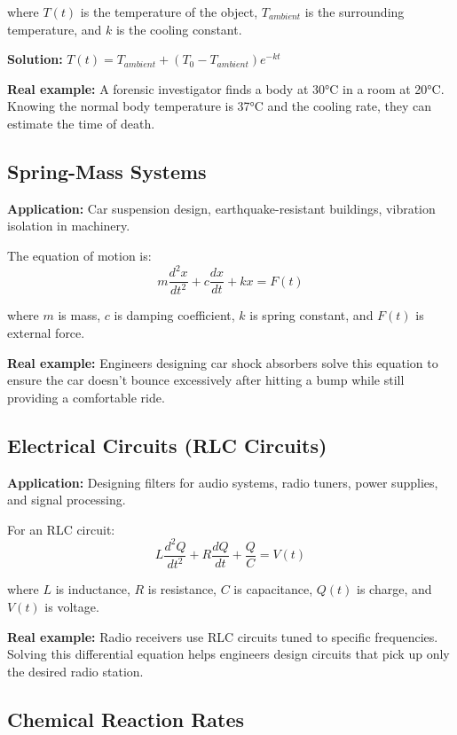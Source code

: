 \documentclass{article}
\begin{document}
where $T(t)$ is the temperature of the object, $T_{ambient}$ is the surrounding temperature, and $k$ is the cooling constant.

\textbf{Solution:} $T(t) = T_{ambient} + (T_0 - T_{ambient})e^{-kt}$

\textbf{Real example:} A forensic investigator finds a body at 30°C in a room at 20°C. Knowing the normal body temperature is 37°C and the cooling rate, they can estimate the time of death.

\subsection{Spring-Mass Systems}

\textbf{Application:} Car suspension design, earthquake-resistant buildings, vibration isolation in machinery.

The equation of motion is:
\begin{equation}
m\frac{d^2x}{dt^2} + c\frac{dx}{dt} + kx = F(t)
\end{equation}

where $m$ is mass, $c$ is damping coefficient, $k$ is spring constant, and $F(t)$ is external force.

\textbf{Real example:} Engineers designing car shock absorbers solve this equation to ensure the car doesn't bounce excessively after hitting a bump while still providing a comfortable ride.

\subsection{Electrical Circuits (RLC Circuits)}

\textbf{Application:} Designing filters for audio systems, radio tuners, power supplies, and signal processing.

For an RLC circuit:
\begin{equation}
L\frac{d^2Q}{dt^2} + R\frac{dQ}{dt} + \frac{Q}{C} = V(t)
\end{equation}

where $L$ is inductance, $R$ is resistance, $C$ is capacitance, $Q(t)$ is charge, and $V(t)$ is voltage.

\textbf{Real example:} Radio receivers use RLC circuits tuned to specific frequencies. Solving this differential equation helps engineers design circuits that pick up only the desired radio station.

\subsection{Chemical Reaction Rates}
\end{document}
